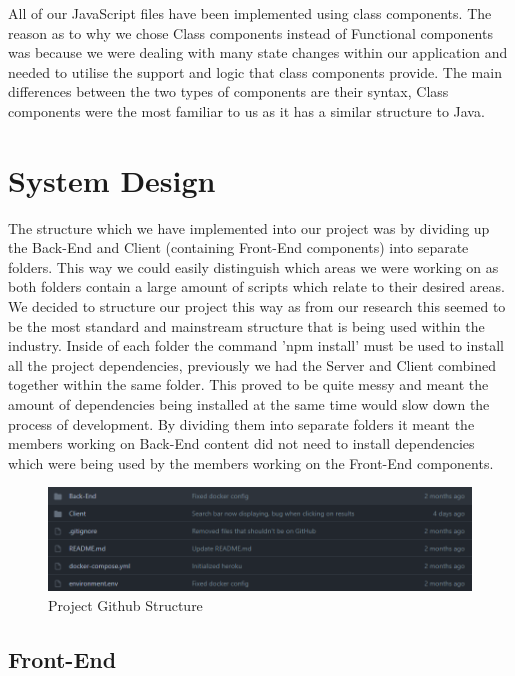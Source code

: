 All of our JavaScript files have been implemented using class components. The reason as to why we chose Class components instead of Functional components was because we were dealing with many state changes within our application and needed to utilise the support and logic that class components provide. The main differences between the two types of components are their syntax, Class components were the most familiar to us as it has a similar structure to Java.


\chapter{System Design}

The structure which we have implemented into our project was by dividing up the Back-End and Client (containing Front-End components) into separate folders. This way we could easily distinguish which areas we were working on as both folders contain a large amount of scripts which relate to their desired areas. We decided to structure our project this way as from our research this seemed to be the most standard and mainstream structure that is being used within the industry. Inside of each folder the command 'npm install' must be used to install all the project dependencies, previously we had the Server and Client combined together within the same folder. This proved to be quite messy and meant the amount of dependencies being installed at the same time would slow down the process of development. By dividing them into separate folders it meant the members working on Back-End content did not need to install dependencies which were being used by the members working on the Front-End components.

\begin{figure}[H]
  \centering
  \includegraphics[scale=0.65]{img/structure.PNG}
  \caption{Project Github Structure}
  \label{fig:Project Github Structure}
\end{figure}


\section{Front-End}

